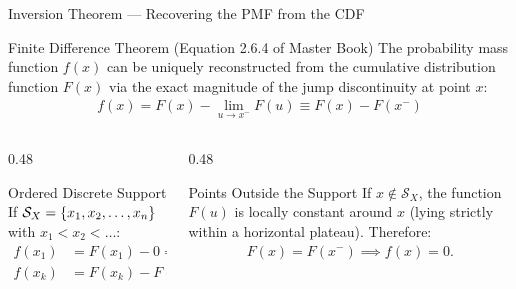 \documentclass[aspectratio=169,xcolor={dvipsnames,table}]{beamer}
\begin{document}
\begin{frame}{Inversion Theorem --- Recovering the PMF from the CDF}
	\begin{block}{Finite Difference Theorem (Equation 2.6.4 of Master Book)}
		\small
		The probability mass function $f(x)$ can be uniquely reconstructed from the cumulative distribution function $F(x)$ via the exact magnitude of the jump discontinuity at point $x$:
		\begin{align*}
			f(x) = F(x) - \lim_{u \to x^-} F(u) \equiv F(x) - F(x^-)
		\end{align*}
	\end{block}
	\vspace{-0.15cm}
	\begin{columns}[T]
		\begin{column}{0.48\textwidth}
			\begin{exampleblock}{Ordered Discrete Support}
				\scriptsize
				If $\mathcal{S}_X = \left\{ x_1, x_2, \dots, x_n \right\}$ with $x_1 < x_2 < \dots$:
				\begin{align*}
					f(x_1) &= F(x_1) - 0 = F(x_1), \\
					f(x_k) &= F(x_k) - F(x_{k-1}) \quad (k > 1).
				\end{align*}
			\end{exampleblock}
		\end{column}
		\begin{column}{0.48\textwidth}
			\begin{alertblock}{Points Outside the Support}
				\scriptsize
				If $x \notin \mathcal{S}_X$, the function $F(u)$ is locally constant around $x$ (lying strictly within a horizontal plateau). Therefore:
				\begin{align*}
					F(x) = F(x^-) \implies f(x) = 0.
				\end{align*}
			\end{alertblock}
		\end{column}
	\end{columns}
\end{frame}
\end{document}
